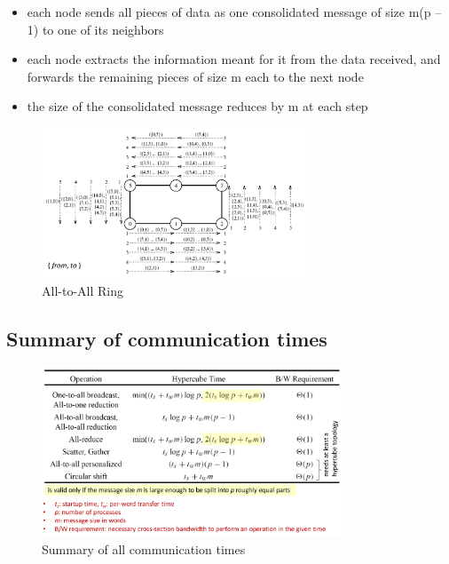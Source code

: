 \begin{itemize}
\tightlist
\item
  each node sends all pieces of data as one consolidated message of size
  m(p -- 1) to one of its neighbors
\item
  each node extracts the information meant for it from the data
  received, and forwards the remaining pieces of size m each to the next
  node
\item
  the size of the consolidated message reduces by m at each step
\end{itemize}

\begin{figure}[H]
\centering
\includegraphics[width=0.7\textwidth]{figures/all-to-all-ring.png}
\caption{All-to-All Ring}
\end{figure}

\hypertarget{summary-of-communication-times}{%
\subsection{Summary of communication
times}\label{summary-of-communication-times}}

\begin{figure}[H]
\centering
\includegraphics[width=0.8\textwidth]{figures/summary-CommunicationTimes.png}
\caption{Summary of all communication times}
\end{figure}

\clearpage